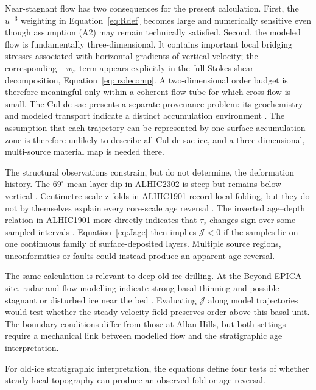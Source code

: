 \documentclass[review]{igs}
\newcommand{\parencite}{\citep}
\theoremstyle{definition}
\theoremstyle{remark}
\newcommand{\Jord}{\mathcal{J}}
\begin{document}
Near-stagnant flow has two consequences for the present calculation. First, the \(u^{-3}\) weighting in Equation~\eqref{eq:Rdef} becomes large and numerically sensitive even though assumption (A2) may remain technically satisfied. Second, the modeled flow is fundamentally three-dimensional. It contains important local bridging stresses associated with horizontal gradients of vertical velocity; the corresponding \(-w_x\) term appears explicitly in the full-Stokes shear decomposition, Equation~\eqref{eq:uzdecomp}. A two-dimensional order budget is therefore meaningful only within a coherent flow tube for which cross-flow is small. The Cul-de-sac presents a separate provenance problem: its geochemistry and modeled transport indicate a distinct accumulation environment \parencite{Manos2026}. The assumption that each trajectory can be represented by one surface accumulation zone is therefore unlikely to describe all Cul-de-sac ice, and a three-dimensional, multi-source material map is needed there.

The structural observations constrain, but do not determine, the deformation history. The \(69^{\circ}\) mean layer dip in ALHIC2302 is steep but remains below vertical \parencite{Kirkpatrick2025}. Centimetre-scale z-folds in ALHIC1901 record local folding, but they do not by themselves explain every core-scale age reversal \parencite{Stoll2026}. The inverted age--depth relation in ALHIC1901 more directly indicates that \(\tau_z\) changes sign over some sampled intervals \parencite{Shackleton2025}. Equation~\eqref{eq:Jage} then implies \(\Jord<0\) if the samples lie on one continuous family of surface-deposited layers. Multiple source regions, unconformities or faults could instead produce an apparent age reversal.

The same calculation is relevant to deep old-ice drilling. At the Beyond EPICA site, radar and flow modelling indicate strong basal thinning and possible stagnant or disturbed ice near the bed \parencite{Lilien2021,Chung2025BeyondEPICA}. Evaluating \(\Jord\) along model trajectories would test whether the steady velocity field preserves order above this basal unit. The boundary conditions differ from those at Allan Hills, but both settings require a mechanical link between modelled flow and the stratigraphic age interpretation.

For old-ice stratigraphic interpretation, the equations define four tests of whether steady local topography can produce an observed fold or age reversal.
\end{document}
